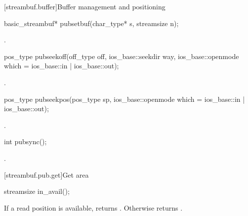 [streambuf.buffer]{Buffer management and positioning}

%
\begin{itemdecl}
basic_streambuf* pubsetbuf(char_type* s, streamsize n);
\end{itemdecl}

\begin{itemdescr}
\pnum
\returns
{}.
\end{itemdescr}

%
\begin{itemdecl}
pos_type pubseekoff(off_type off, ios_base::seekdir way,
                    ios_base::openmode which
                      = ios_base::in | ios_base::out);
\end{itemdecl}

\begin{itemdescr}
\pnum
\returns
{}.
\end{itemdescr}

%
\begin{itemdecl}
pos_type pubseekpos(pos_type sp,
                    ios_base::openmode which
                      = ios_base::in | ios_base::out);
\end{itemdecl}

\begin{itemdescr}
\pnum
\returns
{}.
\end{itemdescr}

%
\begin{itemdecl}
int pubsync();
\end{itemdecl}

\begin{itemdescr}
\pnum
\returns
{}.
\end{itemdescr}

[streambuf.pub.get]{Get area}

%
\begin{itemdecl}
streamsize in_avail();
\end{itemdecl}

\begin{itemdescr}
\pnum
\returns
If a read position is available, returns
.
Otherwise returns
.
\end{itemdescr}

